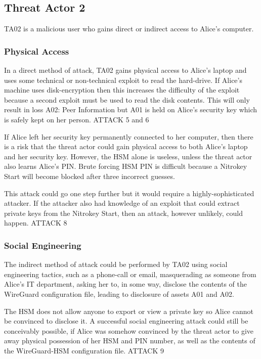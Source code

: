 \documentclass [11pt, proquest] {uwthesis}[2020/02/24]
\begin{document}
\subsection{Threat Actor 2}
TA02 is a malicious user who gains direct or indirect access to Alice's computer. 

\subsubsection{Physical Access}
In a direct method of attack, TA02 gains physical access to Alice's laptop and uses some technical or non-technical exploit to read the hard-drive. If Alice's machine uses disk-encryption then this increases the difficulty of the exploit because a second exploit must be used to read the disk contents.
This will only result in loss A02: Peer Information but A01 is held on Alice's security key which is safely kept on her person.
ATTACK 5 and 6 

If Alice left her security key permanently connected to her computer, then there is a risk that the threat actor could gain physical access to both Alice's laptop and her security key. However, the HSM alone is useless, unless the threat actor also learns Alice's PIN. Brute forcing HSM PIN is difficult because a Nitrokey Start will become blocked after three incorrect guesses.

This attack could go one step further but it would require a highly-sophisticated attacker. If the attacker also had knowledge of an exploit that could extract private keys from the Nitrokey Start, then an attack, however unlikely, could happen.
ATTACK 8

\subsubsection{Social Engineering}
The indirect method of attack could be performed by TA02 using social engineering tactics, such as a phone-call or email, masquerading as someone from Alice's IT department, asking her to, in some way, disclose the contents of the WireGuard configuration file, leading to disclosure of assets A01 and A02.

The HSM does not allow anyone to export or view a private key so Alice cannot be convinced to disclose it.
A successful social engineering attack could still be conceivably possible, if Alice was somehow convinced by the threat actor to give away physical possession of her HSM and PIN number, as well as the contents of the WireGuard-HSM configuration file.
ATTACK 9
\end{document}
